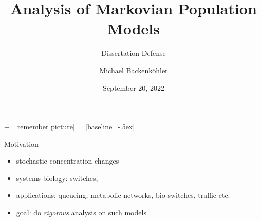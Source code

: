 \documentclass[10pt]{beamer}
\title{Analysis of Markovian Population Models}
\subtitle{Dissertation Defense}
\author{Michael Backenk\"{o}hler}
\institute{Saarland Informatics Campus}
\date{September 20, 2022}
\begin{document}
+=[remember picture]
 = [baseline=-.5ex]

\begin{frame}
\titlepage
\end{frame}

\begin{frame}{Motivation}
  \begin{itemize}
    \item stochastic concentration changes
    \item systems biology: switches, 
    \item applications: queueing, metabolic networks, bio-switches, traffic etc.
    \item goal: do \emph{rigorous} analysis on such models
  \end{itemize}
\end{frame}
\end{document}
